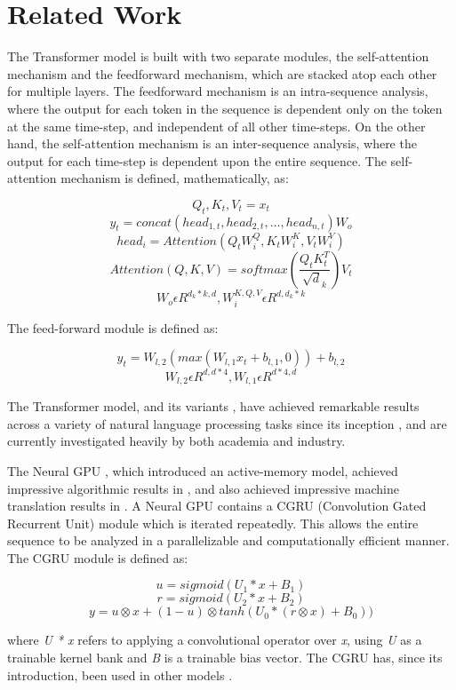 \documentclass{article}
\begin{document}
\section{Related Work}

The Transformer model \cite{vaswani2017} is built with two separate modules, the self-attention mechanism and the feedforward mechanism, which are stacked atop each other for multiple layers. The feedforward mechanism is an intra-sequence analysis, where the output for each token in the sequence is dependent only on the token at the same time-step, and independent of all other time-steps. On the other hand, the self-attention mechanism is an inter-sequence analysis, where the output for each time-step is dependent upon the entire sequence. The self-attention mechanism is defined, mathematically, as:

\[Q_{t}, K_{t}, V_{t} = x_{t} \]
\[y_{t} = concat(head_{1,t}, head_{2,t}, …, head_{n,t})W_{o} \]
\[head_{i} = Attention(Q_{t}W_{i}^Q, K_{t}W_{i}^K, V_{t}W_{i}^V) \]
\[Attention(Q, K, V) = softmax(\frac{Q_{t}K_{t}^T}{\sqrt d_k}) V_{t} \]
\[W_{o} \epsilon R^{d_k * k, d}, W_{i}^{K,Q,V} \epsilon R^{d, d_k * k} \]

The feed-forward module is defined as:

\[y_{t} = W_{l,2}(max(W_{l,1}x_{t} + b_{l,1}, 0)) + b_{l,2} \]
\[W_{l,2} \epsilon R^{d, d * 4}, W_{l,1} \epsilon R^{d * 4, d} \]

The Transformer model, and its variants \cite{transformerxl}, have achieved remarkable results across a variety of natural language processing tasks since its inception \cite{albert} \cite{bert} \cite{xlnet} , and are currently investigated heavily by both academia and industry.

The Neural GPU \cite{freivalds} \cite{kaiser2016} \cite{kaiser2015}, which introduced an active-memory model, achieved impressive algorithmic results in \cite{kaiser2015}, and also achieved impressive machine translation results in \cite{kaiser2016}. A Neural GPU contains a CGRU (Convolution Gated Recurrent Unit) module which is iterated repeatedly. This allows the entire sequence to be analyzed in a parallelizable and computationally efficient manner. The CGRU module is defined as:

\[u = sigmoid(U_1 * x + B_1) \]
\[r = sigmoid(U_2 * x + B_2) \]
\[y = u \otimes x + (1 - u) \otimes tanh(U_0 * (r \otimes x) + B_0)) \]
 
\noindent
where \textit{U * x} refers to applying a convolutional operator over \textit{x}, using \textit{U} as a trainable kernel bank and \textit{B} is a trainable bias vector. The CGRU has, since its introduction, been used in other models \cite{one_shot_draw}.
\end{document}
